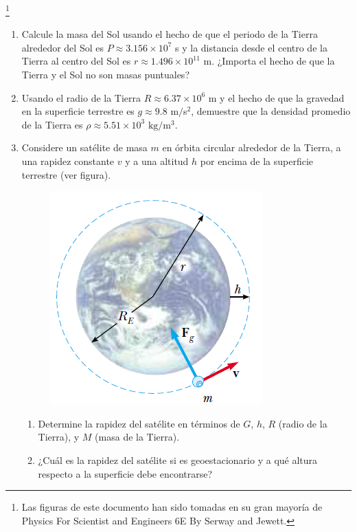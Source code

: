 \documentclass[11pt,twocolumn]{article}
\title{}
\author{}
\date{}
\begin{document}
\pagestyle{empty}
\sffamily
{}
\footnote{Las figuras de este documento han sido tomadas en su gran mayoría de Physics For Scientist and Engineers 6E By Serway and Jewett.}

\begin{enumerate}

\item Calcule la masa del Sol usando el hecho de que el periodo de la Tierra alrededor del Sol es $P \approx 3.156 \times 10^{7}$ s y la distancia desde el centro de la Tierra al centro del Sol es $r \approx 1.496 \times 10^{11}$ m. ¿Importa el hecho de que la Tierra y el Sol no son masas puntuales?

\item Usando el radio de la Tierra $R \approx 6.37 \times 10^{6}$ m y el hecho de que la gravedad en la superficie terrestre es $g \approx 9.8$ m$/$s$^{2}$, demuestre que la densidad promedio de la Tierra es $\rho \approx 5.51 \times 10^{3}$ $\text{kg}/\text{m}^{3}$.

\item Considere un satélite de masa $m$ en órbita circular alrededor de la Tierra, a una rapidez constante $v$ y a una altitud $h$ por encima de la superficie terrestre (ver figura).
\begin{figure}[h]
\centering
\includegraphics[scale=0.35]{fig1}
\end{figure}
\begin{enumerate}
\item Determine la rapidez del satélite en términos de $G$, $h$, $R$ (radio de la Tierra), y $M$ (masa de la Tierra).
\item ¿Cuál es la rapidez del satélite si es geoestacionario y a qué altura respecto a la superficie debe encontrarse?
\end{enumerate}


\end{enumerate}
\end{document}

